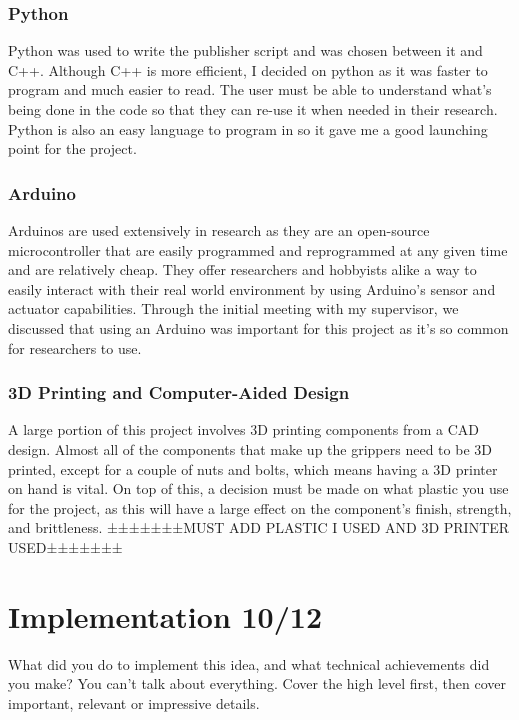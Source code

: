 \documentclass{l4proj}
\begin{document}
\subsection{Python}
Python was used to write the publisher script and was chosen between it and C++. Although C++ is more efficient, I decided on python as it was faster to program and much easier to read. The user must be able to understand what's being done in the code so that they can re-use it when needed in their research. Python is also an easy language to program in so it gave me a good launching point for the project. 

\subsection{Arduino} 
Arduinos are used extensively in research as they are an open-source microcontroller that are easily programmed and reprogrammed at any given time and are relatively cheap. They offer researchers and hobbyists alike a way to easily interact with their real world environment by using Arduino's sensor and actuator capabilities. Through the initial meeting with my supervisor, we discussed that using an Arduino was important for this project as it's so common for researchers to use.

\subsection{3D Printing and Computer-Aided Design}
A large portion of this project involves 3D printing components from a CAD design. Almost all of the components that make up the grippers need to be 3D printed, except for a couple of nuts and bolts, which means having a 3D printer on hand is vital. On top of this, a decision must be made on what plastic you use for the project, as this will have a large effect on the component's finish, strength, and brittleness. ±±±±±±±MUST ADD PLASTIC I USED AND 3D PRINTER USED±±±±±±±

\chapter{Implementation 10/12}
What did you do to implement this idea, and what technical achievements did you make?
You can't talk about everything. Cover the high level first, then cover important, relevant or impressive details.
\end{document}
